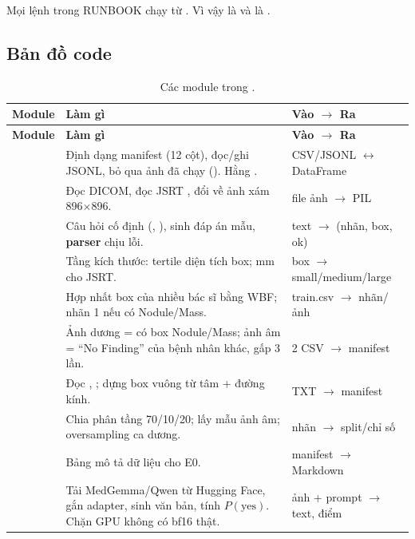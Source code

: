 Mọi lệnh trong RUNBOOK chạy từ . Vì vậy  là  và
 là .

\subsection{Bản đồ code}

\begin{center}
\small
\begin{longtable}{@{}P{4.1cm}P{5.8cm}P{4.8cm}@{}}
\caption{Các module trong .}\label{tab:codemap}\\
\toprule
\textbf{Module} & \textbf{Làm gì} & \textbf{Vào $\rightarrow$ Ra} \\
\midrule\endfirsthead
\toprule
\textbf{Module} & \textbf{Làm gì} & \textbf{Vào $\rightarrow$ Ra} \\
\midrule\endhead
{} & Định dạng manifest (12 cột), đọc/ghi JSONL, bỏ qua ảnh đã chạy (). Hằng . & CSV/JSONL $\leftrightarrow$ DataFrame \\
 & Đọc DICOM, đọc JSRT , đổi về ảnh xám 896$\times$896. & file ảnh $\rightarrow$ PIL \\
 & Câu hỏi cố định (, ), sinh đáp án mẫu, \textbf{parser} chịu lỗi. & text $\rightarrow$ (nhãn, box, ok) \\
 & Tầng kích thước: tertile diện tích box; mm cho JSRT. & box $\rightarrow$ small/medium/large \\
 & Hợp nhất box của nhiều bác sĩ bằng WBF; nhãn 1 nếu có Nodule/Mass. & train.csv $\rightarrow$ nhãn/ảnh \\
 & Ảnh dương = có box Nodule/Mass; ảnh âm = ``No Finding'' của bệnh nhân khác, gấp 3 lần. & 2 CSV $\rightarrow$ manifest \\
 & Đọc , ; dựng box vuông từ tâm + đường kính. & TXT $\rightarrow$ manifest \\
 & Chia phân tầng 70/10/20; lấy mẫu ảnh âm; oversampling ca dương. & nhãn $\rightarrow$ split/chỉ số \\
 & Bảng mô tả dữ liệu cho E0. & manifest $\rightarrow$ Markdown \\
 & Tải MedGemma/Qwen từ Hugging Face, gắn adapter, sinh văn bản, tính $P(\text{yes})$. Chặn GPU không có bf16 thật. & ảnh + prompt $\rightarrow$ text, điểm \\

\end{longtable}
\end{center}
